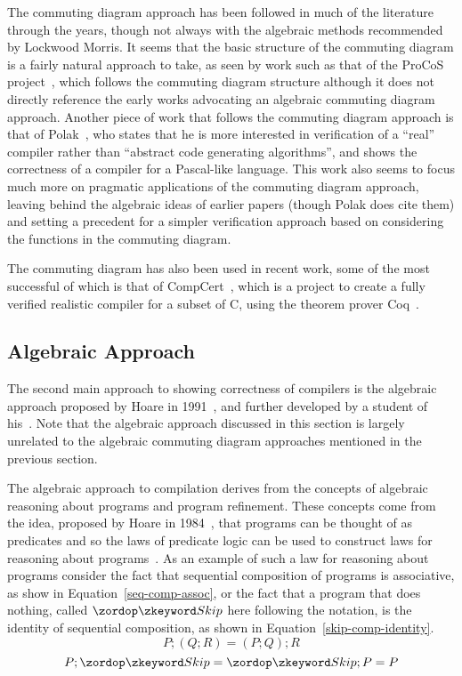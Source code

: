 \documentclass[a4paper,10pt]{report}
\begin{document}
The commuting diagram approach has been followed in much of the literature
through the years, though not always with the algebraic methods recommended by
Lockwood Morris.  It seems that the basic structure of the commuting diagram is
a fairly natural approach to take, as seen by work such as that of the ProCoS
project~\cite{buth1992}, which follows the commuting diagram structure although
it does not directly reference the early works advocating an algebraic commuting
diagram approach. Another piece of work that follows the commuting diagram
approach is that of Polak~\cite{polak1981}, who states that he is more
interested in verification of a ``real'' compiler rather than ``abstract code
generating algorithms'', and shows the correctness of a compiler for a
Pascal-like language.  This work also seems to focus much more on pragmatic
applications of the commuting diagram approach, leaving behind the algebraic
ideas of earlier papers (though Polak does cite them) and setting a precedent
for a simpler verification approach based on considering the functions in the
commuting diagram.

The commuting diagram has also been used in recent work, some of the most
successful of which is that of CompCert~\cite{leroy2009a, leroy2009b,
  leroy2012}, which is a project to create a fully verified realistic compiler
for a subset of C, using the theorem prover Coq~\cite{coq2004}.

\subsection{Algebraic Approach}
\label{algebraic-approach-subsection}

The second main approach to showing correctness of compilers is the algebraic
approach proposed by Hoare in 1991~\cite{hoare1991}, and further developed by a
student of his~\cite{hoare1993, sampaio1993, sampaio1997}. Note that the
algebraic approach discussed in this section is largely unrelated to the
algebraic commuting diagram approaches mentioned in the previous section.

The algebraic approach to compilation derives from the concepts of algebraic
reasoning about programs and program refinement. These concepts come from the
idea, proposed by Hoare in 1984~\cite{hoare1984}, that programs can be thought
of as predicates and so the laws of predicate logic can be used to construct
laws for reasoning about programs~\cite{hoare1987}. As an example of such a law
for reasoning about programs consider the fact that sequential composition of
programs is associative, as show in Equation~\eqref{seq-comp-assoc}, or the fact
that a program that does nothing, called $\Skip$ here following the \Circus{}
notation, is the identity of sequential composition, as shown in
Equation~\eqref{skip-comp-identity}.
\begin{equation}
  \label{seq-comp-assoc}
  P;(Q;R) = (P;Q);R
\end{equation}
\begin{equation}
  \label{skip-comp-identity}
  P;\Skip = \Skip;P = P
\end{equation}
\end{document}
